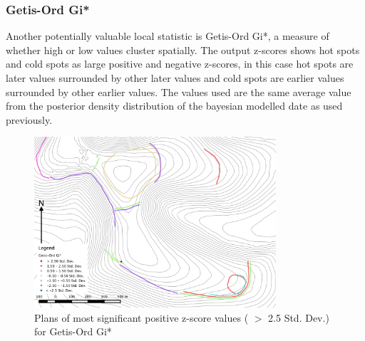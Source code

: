 \subsubsection{Getis-Ord Gi*}
Another potentially valuable local statistic is Getis-Ord Gi*, a measure of whether high or low values cluster spatially. The output z-scores shows hot spots and cold spots as large positive and negative z-scores, in this case hot spots are later values surrounded by other later values and cold spots are earlier values surrounded by other earlier values. The values used are the same average value from the posterior density distribution of the bayesian modelled date as used previously.

\begin{figure}
\centering
	\includegraphics[width=0.8\textwidth]{figures/hotspot-1}
  \caption{Plans of most significant positive z-score values ( $>$ 2.5 Std. Dev.)  for Getis-Ord Gi*}
  \label{fig:hotspot-1}
\end{figure}

